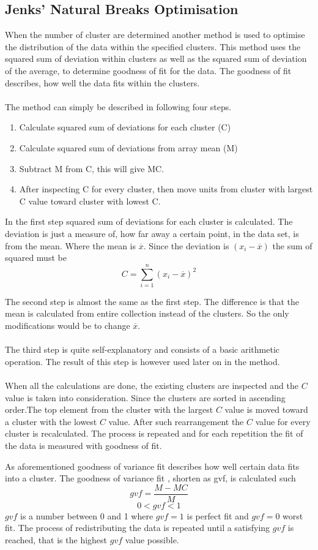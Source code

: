 \subsection{Jenks' Natural Breaks Optimisation}
\label{sub:jenks} 
When the number of cluster are determined another method is used to optimise the distribution of the data within the specified clusters. This method uses the squared sum of deviation within clusters as well as the squared sum of deviation of the average, to determine goodness of fit for the data. The goodness of fit describes, how well the data fits within the clusters.
\\\\
The method can simply be described in following four steps.
\begin{enumerate}
  \item Calculate squared sum of deviations for each cluster (C)
  \item Calculate squared sum of deviations from array mean (M)
  \item Subtract M from C, this will give MC.
  \item After inspecting C for every cluster, then move units from cluster with largest C value toward cluster with lowest C.
\end{enumerate}
In the first step squared sum of deviations for each cluster is calculated. The deviation is just a measure of, how far away a certain point, in the data set, is from the mean. Where the mean is $\overline{x}$. Since the deviation is $(x_i-\overline{x})$ the sum of squared must be $$C= \displaystyle\sum_{i=1}^{n}(x_i-\overline{x})^2$$

The second step is almost the same as the first step. The difference is that the mean is calculated from entire collection instead of the clusters. So the only modifications would be to change $\overline{x}$.
\\\\
The third step is quite self-explanatory and consists of a basic arithmetic operation. The result of this step is however used later on in the method.
\\\\
When all the calculations are done, the existing clusters are inspected and the $C$ value is taken into consideration. Since the clusters are sorted in ascending order.The top element from the cluster with the largest $C$ value is moved toward a cluster with the lowest $C$ value. After such rearrangement the $C$ value for every cluster is recalculated. The process is repeated and for each repetition the fit of the data is measured with goodness of fit.


As aforementioned goodness of variance fit describes how well certain data fits into a cluster. The goodness of variance fit , shorten as gvf, is calculated such $$gvf = \frac{M-MC}{M}$$
$$0<gvf<1$$
$gvf$ is a number between 0 and 1 where $gvf = 1$ is perfect fit and $gvf = 0$ worst fit.
The process of redistributing the data is repeated until a satisfying $gvf$ is reached, that is the highest $gvf$ value possible.